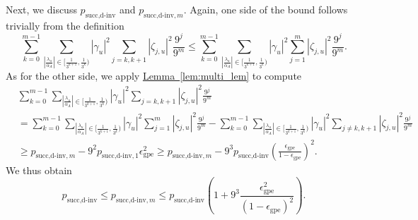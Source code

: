 \documentclass[letterpaper,onecolumn,11pt,accepted=2026-02-14]{quantumarticle}
\newcommand{\abs}[1]{\left\lvert#1\right\rvert}
\theoremstyle{remark}
\theoremstyle{plain}
\newcommand{\lem}[1]{\hyperref[lem:#1]{Lemma~\ref*{lem:#1}}}
\begin{document}
Next, we discuss $p_{\text{succ,d-inv}}$ and $p_{\text{succ,d-inv},m}$. Again, one side of the bound follows trivially from the definition
\begin{equation}
    \sum_{k=0}^{m-1}\sum_{\abs{\frac{\lambda_u}{\alpha_A}}\in\big[\frac{1}{3^{k+1}},\frac{1}{3^k}\big)}
    \abs{\gamma_u}^2
    \sum_{j= k,k+1}\abs{\zeta_{j,u}}^2\frac{9^{j}}{9^m}
    \leq\sum_{k=0}^{m-1}\sum_{\abs{\frac{\lambda_u}{\alpha_A}}\in\big[\frac{1}{3^{k+1}},\frac{1}{3^k}\big)}
    \abs{\gamma_u}^2
    \sum_{j=1}^m\abs{\zeta_{j,u}}^2\frac{9^{j}}{9^m}.
\end{equation}
As for the other side, we apply \lem{multi_lem} to compute
\begin{equation}
\begin{aligned}
    &\sum_{k=0}^{m-1}\sum_{\abs{\frac{\lambda_u}{\alpha_A}}\in\big[\frac{1}{3^{k+1}},\frac{1}{3^k}\big)}
    \abs{\gamma_u}^2
    \sum_{j= k,k+1}\abs{\zeta_{j,u}}^2\frac{9^{j}}{9^m}\\
    &=\sum_{k=0}^{m-1}\sum_{\abs{\frac{\lambda_u}{\alpha_A}}\in\big[\frac{1}{3^{k+1}},\frac{1}{3^k}\big)}
    \abs{\gamma_u}^2
    \sum_{j=1}^m\abs{\zeta_{j,u}}^2\frac{9^{j}}{9^m}
    -\sum_{k=0}^{m-1}\sum_{\abs{\frac{\lambda_u}{\alpha_A}}\in\big[\frac{1}{3^{k+1}},\frac{1}{3^k}\big)}
    \abs{\gamma_u}^2
    \sum_{j\neq k,k+1}\abs{\zeta_{j,u}}^2\frac{9^{j}}{9^m}\\
    &\geq p_{\text{succ,d-inv},m}-9^2p_{\text{succ,d-inv},1}\epsilon_{\text{gpe}}^2
    \geq p_{\text{succ,d-inv},m}-9^3p_{\text{succ,d-inv}}\left(\frac{\epsilon_{\text{gpe}}}{1-\epsilon_{\text{gpe}}}\right)^2.
\end{aligned}
\end{equation}
We thus obtain
\begin{equation}
    p_{\text{succ,d-inv}}
    \leq p_{\text{succ,d-inv},m}
    \leq p_{\text{succ,d-inv}}\left(1+9^3\frac{\epsilon_{\text{gpe}}^2}{\left(1-\epsilon_{\text{gpe}}\right)^2}\right).
\end{equation}
\end{document}
